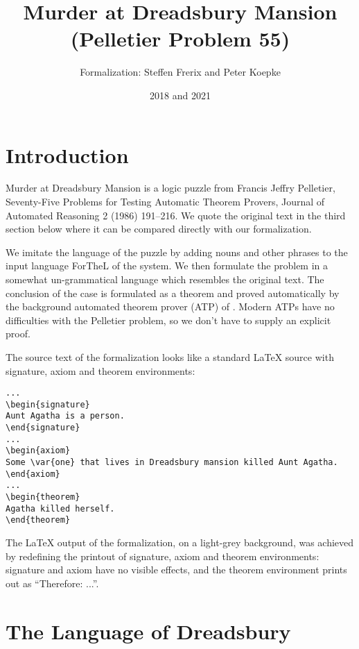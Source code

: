 \documentclass{article}
\title{Murder at Dreadsbury Mansion (Pelletier Problem 55)}
\author{\Naproche Formalization: Steffen Frerix and Peter Koepke}
\date{2018 and 2021}
\begin{document}

\maketitle


\section{Introduction}

Murder at Dreadsbury Mansion is a logic puzzle from
Francis Jeffry Pelletier, Seventy-Five Problems for Testing
Automatic Theorem Provers, Journal of Automated Reasoning 2 (1986) 191--216.
We quote the original text in the third section below where it can
be compared directly with our formalization.

We imitate the language of the puzzle by
adding nouns and other phrases to the input language ForTheL of the \Naproche system.
We then formulate the problem in a somewhat un-grammatical language
which resembles the original text.
The conclusion of the case is formulated as a theorem and
proved automatically by the background automated theorem prover (ATP) of \Naproche. Modern
ATPs have no difficulties with the Pelletier problem, so we don't
have to supply an explicit proof.

The source text of the formalization looks like a standard \LaTeX{} source
with signature, axiom and theorem environments:

\begin{verbatim}
...
\begin{signature}
Aunt Agatha is a person.
\end{signature}
...
\begin{axiom}
Some \var{one} that lives in Dreadsbury mansion killed Aunt Agatha.
\end{axiom}
...
\begin{theorem}
Agatha killed herself.
\end{theorem}
\end{verbatim}

The \LaTeX{} output of the formalization, on a light-grey background, was
achieved by redefining the printout of signature,
axiom and theorem environments: signature and axiom have no
visible effects, and
the theorem environment prints out as ``Therefore: ...''.


\section{The Language of Dreadsbury}
\end{document}
